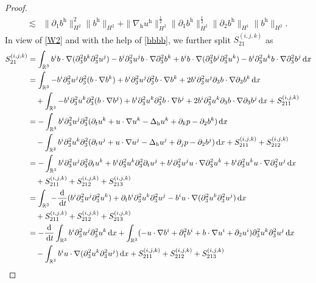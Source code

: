 \documentclass[11pt]{amsart}
\theoremstyle{definition}
\newcommand{\R}{\mathbb{R}}
\newcommand{\h}{\mathrm{h}}
\newcommand{\dx}{\,{\rm d}x}
\newcommand{\dt}{\,{\rm d}t}
\newcommand{\nablah}{\nabla_{\mathrm{h}}}
\numberwithin{equation}{section}
\begin{document}
\begin{proof}
\begin{align}
		\lesssim&\|\partial_1b^\h\|_{H^2}^2\|b^\h\|_{H^2}+\|\nablah u^\h\|_{H^2}^\frac12\|\partial_1b^\h\|_{H^2}^\frac12\|\partial_2b^\h\|_{H^1}\|b^\h\|_{H^2}.
	\end{align}
	In view of \eqref{W2} and with the help of \eqref{bbbb}, we further split $S^{(i,j,k)}_{21}$ as
	\begin{align}\label{S21deco}
		S^{(i,j,k)}_{21}&=\int_{\R^3} b^ib\cdot\nabla (\partial_3^2b^k\partial_3^2u^j)-b^i\partial_3^2u^jb\cdot\nabla \partial_3^2b^k+ b^ib\cdot\nabla (\partial_3^2b^j\partial_3^2u^k)-b^i\partial_3^2u^kb\cdot\nabla \partial_3^2b^j\dx\nonumber\\
		&=\int_{\R^3}-b^i\partial_3^2u^j\partial_3^2(b\cdot\nabla b^k)+b^i\partial_3^2u^j\partial_3^2b\cdot\nabla b^k+2b^i\partial_3^2u^j\partial_3b\cdot\nabla \partial_3b^k\dx\nonumber\\
		&\quad+\int_{\R^3}-b^i\partial_3^2u^k\partial_3^2(b\cdot\nabla b^j)+b^i\partial_3^2u^k\partial_3^2b\cdot\nabla b^j+2b^i\partial_3^2u^k\partial_3b\cdot\nabla \partial_3b^j\dx+S^{(i,j,k)}_{211}\nonumber\\
		&=-\int_{\R^3}b^i\partial_3^2u^j\partial_3^2(\partial_tu^k+u\cdot \nabla u^k-\Delta_\h u^k+\partial_kp-\partial_2b^k)\dx\nonumber\\
		&\quad-\int_{\R^3}b^i\partial_3^2u^k\partial_3^2(\partial_tu^j+u\cdot \nabla u^j-\Delta_\h u^j+\partial_jp-\partial_2b^j)\dx+S^{(i,j,k)}_{211}+S^{(i,j,k)}_{212}\nonumber\\
		&=-\int_{\R^3}b^i\partial_3^2u^j\partial_3^2\partial_tu^k+b^i\partial_3^2u^k\partial_3^2\partial_tu^j+b^i\partial_3^2u^j u\cdot \nabla \partial_3^2u^k+b^i\partial_3^2u^k u\cdot \nabla \partial_3^2u^j\dx\nonumber\\
		&\quad+S^{(i,j,k)}_{211}+S^{(i,j,k)}_{212}+S^{(i,j,k)}_{213}\nonumber\\
		&=\int_{\R^3}-\frac{\mathrm{d}}{\dt}(b^i\partial_3^2u^j\partial_3^2u^k)+\partial_tb^i\partial_3^2u^k\partial_3^2u^j-b^i u\cdot \nabla (\partial_3^2u^k\partial_3^2u^j)\dx\nonumber\\
		&\quad+S^{(i,j,k)}_{211}+S^{(i,j,k)}_{212}+S^{(i,j,k)}_{213}\nonumber\\
		& =-\frac{\mathrm{d}}{\dt}\int_{\R^3}b^i\partial_3^2u^j\partial_3^2u^k\dx+\int_{\R^3}(-u\cdot\nabla b^i+\partial_1^2b^i+b\cdot\nabla u^i+\partial_2u^i)	\partial_3^2u^k\partial_3^2u^j\dx\nonumber\\
		&\quad -\int_{\R^3}b^i u\cdot \nabla (\partial_3^2u^k\partial_3^2u^j)\dx+S^{(i,j,k)}_{211}+S^{(i,j,k)}_{212}+S^{(i,j,k)}_{213}\nonumber\\

\end{align}
\end{proof}
\end{document}
